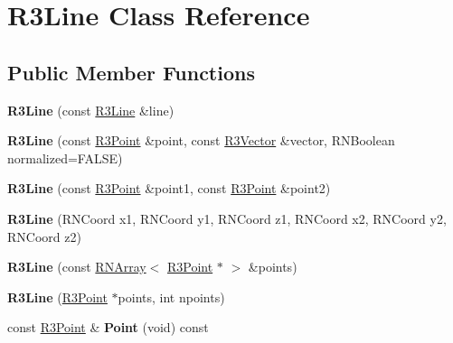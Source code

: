 \hypertarget{class_r3_line}{}\section{R3\+Line Class Reference}
\label{class_r3_line}
\subsection*{Public Member Functions}
\begin{DoxyCompactItemize}
\item 
{\bfseries R3\+Line} (const \hyperlink{class_r3_line}{R3\+Line} \&line)\hypertarget{class_r3_line_a6c4e21cb05b9d18fe2fb2e27e9f2c0f5}{}\label{class_r3_line_a6c4e21cb05b9d18fe2fb2e27e9f2c0f5}

\item 
{\bfseries R3\+Line} (const \hyperlink{class_r3_point}{R3\+Point} \&point, const \hyperlink{class_r3_vector}{R3\+Vector} \&vector, R\+N\+Boolean normalized=F\+A\+L\+SE)\hypertarget{class_r3_line_a11322e14233c2097c16b0ee04f0f0d6d}{}\label{class_r3_line_a11322e14233c2097c16b0ee04f0f0d6d}

\item 
{\bfseries R3\+Line} (const \hyperlink{class_r3_point}{R3\+Point} \&point1, const \hyperlink{class_r3_point}{R3\+Point} \&point2)\hypertarget{class_r3_line_a1c3121d6d0aab241b7d4422bed57b76d}{}\label{class_r3_line_a1c3121d6d0aab241b7d4422bed57b76d}

\item 
{\bfseries R3\+Line} (R\+N\+Coord x1, R\+N\+Coord y1, R\+N\+Coord z1, R\+N\+Coord x2, R\+N\+Coord y2, R\+N\+Coord z2)\hypertarget{class_r3_line_ae46d218409e58b60c0acede0b78bd9e2}{}\label{class_r3_line_ae46d218409e58b60c0acede0b78bd9e2}

\item 
{\bfseries R3\+Line} (const \hyperlink{class_r_n_array}{R\+N\+Array}$<$ \hyperlink{class_r3_point}{R3\+Point} $\ast$ $>$ \&points)\hypertarget{class_r3_line_a4a729fef4fdef20ff4d93e4afa8aade9}{}\label{class_r3_line_a4a729fef4fdef20ff4d93e4afa8aade9}

\item 
{\bfseries R3\+Line} (\hyperlink{class_r3_point}{R3\+Point} $\ast$points, int npoints)\hypertarget{class_r3_line_a1b6d30aeeb34ebdf0e720b9f3292b5be}{}\label{class_r3_line_a1b6d30aeeb34ebdf0e720b9f3292b5be}

\item 
const \hyperlink{class_r3_point}{R3\+Point} \& {\bfseries Point} (void) const \hypertarget{class_r3_line_a5a9252b71fdb385f5e61ee2769627ce7}{}\label{class_r3_line_a5a9252b71fdb385f5e61ee2769627ce7}


\end{DoxyCompactItemize}
